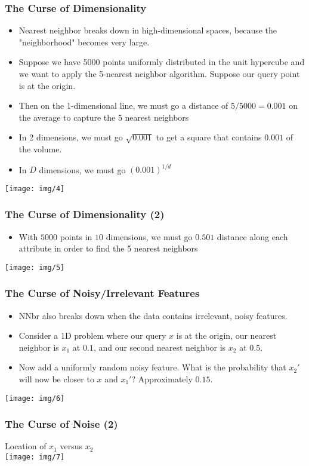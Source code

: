 \documentclass{beamer}
\newcommand*{\utb}{\item[{\texttt{[image: img/UTSymbols-Bullet.png]}}]}
\begin{document}
\begin{frame}
    \frametitle{The Curse of Dimensionality}
    \begin{itemize}
        \utb Nearest neighbor breaks down in high-dimensional spaces, because the "neighborhood" becomes very large.
        \utb Suppose we have 5000 points uniformly distributed in the unit hypercube and we want to apply the 5-nearest neighbor algorithm. Suppose our query point is at the origin.
        \utb Then on the 1-dimensional line, we must go a distance of $5/5000 = 0.001$ on the average to capture the 5 nearest neighbors
        \utb In 2 dimensions, we must go $\sqrt{0.001}$ to get a square that contains $0.001$ of the volume.
        \utb In $D$ dimensions, we must go $(0.001)^{1/d}$
    \end{itemize}
    \begin{center}
        \texttt{[image: img/4]}
    \end{center}
\end{frame}

\begin{frame}
    \frametitle{The Curse of Dimensionality (2)}
    \begin{itemize}
        \utb With $5000$ points in $10$ dimensions, we must go $0.501$ distance along each attribute in order to find the 5 nearest neighbors
    \end{itemize}
    \begin{center}
        \texttt{[image: img/5]}
    \end{center}
\end{frame}

\begin{frame}
    \frametitle{The Curse of Noisy/Irrelevant Features}
    \begin{itemize}
        \utb NNbr also breaks down when the data contains irrelevant, noisy features.
        \utb Consider a 1D problem where our query $x$ is at the origin, our nearest neighbor is $x_1$ at $0.1$, and our second nearest neighbor is $x_2$ at $0.5$.
        \utb Now add a uniformly random noisy feature. What is the probability that $x_2'$ will now be closer to $x$ and $x_1'$? Approximately $0.15$.
    \end{itemize}
    \begin{center}
        \texttt{[image: img/6]}
    \end{center}
\end{frame}

\begin{frame}
    \frametitle{The Curse of Noise (2)}
    \begin{center}
        \Large Location of $x_1$ versus $x_2$ \\
        \texttt{[image: img/7]}
    \end{center}
\end{frame}
\end{document}
